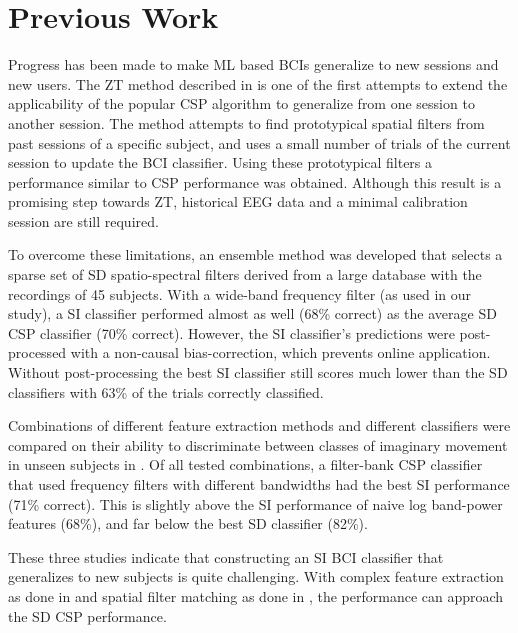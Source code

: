 \section{Previous Work}
Progress has been made to make \ac{ML} based \acp{BCI} generalize
to new sessions and new users.
%
The \acl{ZT} method described in \cite{krauledat2008tzt} is one of the first
attempts to extend the applicability of the popular \ac{CSP} algorithm to
generalize from one session to another session. The method attempts to find
prototypical spatial filters from past sessions of a specific subject, and uses
a small number of trials of the current session to update the \ac{BCI}
classifier. Using these prototypical filters a performance similar to \ac{CSP}
performance was obtained. Although this result is a promising step towards
\acl{ZT}, historical \ac{EEG} data and a minimal calibration session are still
required.

To overcome these limitations, an ensemble method \cite{fazli2009sim} was
developed that selects a sparse set of \ac{SD} spatio-spectral filters derived
from a large database with the recordings of 45 subjects. With a wide-band
frequency filter (as used in our study), a \ac{SI} classifier performed almost
as well (68\% correct) as the average \ac{SD} \ac{CSP} classifier (70\%
correct). However, the \ac{SI} classifier's predictions were post-processed
with a non-causal bias-correction, which prevents online application. Without
post-processing the best \ac{SI} classifier still scores much lower than the
\ac{SD} classifiers with 63\% of the trials correctly classified.

Combinations of different feature extraction methods and different classifiers
were compared on their ability to discriminate between classes of imaginary
movement in unseen subjects in \cite{lotte2009cdt}.
%
Of all tested combinations, a filter-bank \ac{CSP} classifier that used
frequency filters with different bandwidths had the best \ac{SI} performance
(71\% correct). This is slightly above the \ac{SI} performance of naive log
band-power features (68\%), and far below 
the best \ac{SD} classifier (82\%).

These three studies indicate that constructing an \ac{SI} \ac{BCI} classifier
that generalizes to new subjects is quite challenging. With complex feature
extraction as done in \cite{lotte2009cdt} and spatial filter matching as done in
\cite{krauledat2008tzt, fazli2009sim}, the performance can approach the
\ac{SD} \ac{CSP} performance.  

